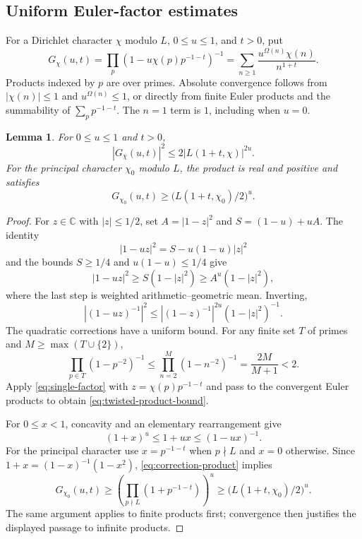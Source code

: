 \documentclass[11pt,reqno]{amsart}
\newtheorem{lemma}[theorem]{Lemma}
\theoremstyle{definition}
\theoremstyle{remark}
\numberwithin{equation}{section}
\newcommand{\C}{\mathbb C}
\newcommand{\Om}{\Omega}
\begin{document}
\subsection{Uniform Euler-factor estimates}
For a Dirichlet character $\chi$ modulo $L$, $0\leq u\leq1$, and $t>0$,
put
\begin{equation}\label{eq:generating-product}
 G_\chi(u,t)=\prod_p(1-u\chi(p)p^{-1-t})^{-1}
          =\sum_{n\geq1}\frac{u^{\Om(n)}\chi(n)}{n^{1+t}}.
\end{equation}
Products indexed by $p$ are over primes. Absolute convergence follows
from $|\chi(n)|\leq1$ and $u^{\Om(n)}\leq1$, or directly from finite
Euler products and the summability of $\sum_p p^{-1-t}$. The $n=1$
term is $1$, including when $u=0$.

\begin{lemma}\label{lem:euler-comparisons}
For $0\leq u\leq1$ and $t>0$,
\begin{equation}\label{eq:twisted-product-bound}
 |G_\chi(u,t)|^2\leq2|L(1+t,\chi)|^{2u}.
\end{equation}
For the principal character $\chi_0$ modulo $L$, the product is real
and positive and satisfies
\begin{equation}\label{eq:principal-product-bound}
 G_{\chi_0}(u,t)\geq\bigl(L(1+t,\chi_0)/2\bigr)^u.
\end{equation}
\end{lemma}

\begin{proof}
For $z\in\C$ with $|z|\leq1/2$, set
$A=|1-z|^2$ and $S=(1-u)+uA$. The identity
\[
 |1-uz|^2=S-u(1-u)|z|^2
\]
and the bounds $S\geq1/4$ and $u(1-u)\leq1/4$ give
\[
 |1-uz|^2\geq S(1-|z|^2)\geq A^u(1-|z|^2),
\]
where the last step is weighted arithmetic--geometric mean. Inverting,
\begin{equation}\label{eq:single-factor}
 |(1-uz)^{-1}|^2
 \leq |(1-z)^{-1}|^{2u}(1-|z|^2)^{-1}.
\end{equation}
The quadratic corrections have a uniform bound. For any finite set
$T$ of primes and $M\geq\max(T\cup\{2\})$,
\begin{equation}\label{eq:correction-product}
 \prod_{p\in T}(1-p^{-2})^{-1}
 \leq\prod_{n=2}^M(1-n^{-2})^{-1}
 =\frac{2M}{M+1}<2.
\end{equation}
Apply \eqref{eq:single-factor} with $z=\chi(p)p^{-1-t}$ and pass to
the convergent Euler products to obtain
\eqref{eq:twisted-product-bound}.

For $0\leq x<1$, concavity and an elementary rearrangement give
\[
 (1+x)^u\leq1+ux\leq(1-ux)^{-1}.
\]
For the principal character use $x=p^{-1-t}$ when $p\nmid L$ and
$x=0$ otherwise. Since $1+x=(1-x)^{-1}(1-x^2)$,
\eqref{eq:correction-product} implies
\[
 G_{\chi_0}(u,t)\geq
 \left(\prod_{p\nmid L}(1+p^{-1-t})\right)^u
 \geq\bigl(L(1+t,\chi_0)/2\bigr)^u.
\]
The same argument applies to finite products first; convergence then
justifies the displayed passage to infinite products.
\end{proof}
\end{document}

